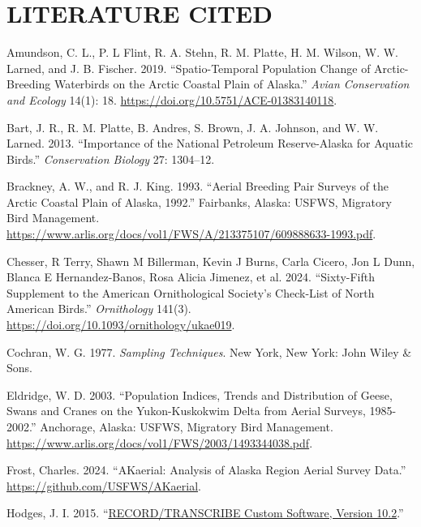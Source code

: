 \documentclass[
]{article}
\newlength{\cslhangindent}
\newenvironment{CSLReferences}[2] %
 {\begin{list}{}{%
  \setlength{\itemindent}{0pt}
  \setlength{\leftmargin}{0pt}
  \setlength{\parsep}{0pt}
  \ifodd #1
   \setlength{\leftmargin}{\cslhangindent}
   \setlength{\itemindent}{-1\cslhangindent}
  \fi
  \setlength{\itemsep}{#2\baselineskip}}}
 {\end{list}}
\begin{document}
\section*{LITERATURE CITED}\label{literature-cited}

\label{refs}
\begin{CSLReferences}{1}{0}
Amundson, C. L., P. L Flint, R. A. Stehn, R. M. Platte, H. M. Wilson, W.
W. Larned, and J. B. Fischer. 2019. {``Spatio-Temporal Population Change
of Arctic-Breeding Waterbirds on the Arctic Coastal Plain of Alaska.''}
\emph{Avian Conservation and Ecology} 14(1): 18.
\url{https://doi.org/10.5751/ACE-01383140118}.

Bart, J. R., R. M. Platte, B. Andres, S. Brown, J. A. Johnson, and W. W.
Larned. 2013. {``Importance of the National Petroleum Reserve-Alaska for
Aquatic Birds.''} \emph{Conservation Biology} 27: 1304--12.

Brackney, A. W., and R. J. King. 1993. {``Aerial Breeding Pair Surveys
of the Arctic Coastal Plain of Alaska, 1992.''} Fairbanks, Alaska:
USFWS, Migratory Bird Management.
\url{https://www.arlis.org/docs/vol1/FWS/A/213375107/609888633-1993.pdf}.

Chesser, R Terry, Shawn M Billerman, Kevin J Burns, Carla Cicero, Jon L
Dunn, Blanca E Hernandez-Banos, Rosa Alicia Jimenez, et al. 2024.
{``Sixty-Fifth Supplement to the American Ornithological Society's
Check-List of North American Birds.''} \emph{Ornithology} 141(3).
\url{https://doi.org/10.1093/ornithology/ukae019}.

Cochran, W. G. 1977. \emph{Sampling Techniques}. New York, New York:
John Wiley \& Sons.

Eldridge, W. D. 2003. {``Population Indices, Trends and Distribution of
Geese, Swans and Cranes on the Yukon-Kuskokwim Delta from Aerial
Surveys, 1985-2002.''} Anchorage, Alaska: USFWS, Migratory Bird
Management.
\url{https://www.arlis.org/docs/vol1/FWS/2003/1493344038.pdf}.

Frost, Charles. 2024. {``AKaerial: Analysis of Alaska Region Aerial
Survey Data.''} \url{https://github.com/USFWS/AKaerial}.

Hodges, J. I. 2015. {``\href{}{RECORD/TRANSCRIBE Custom Software,
Version 10.2}.''}


\end{CSLReferences}
\end{document}
